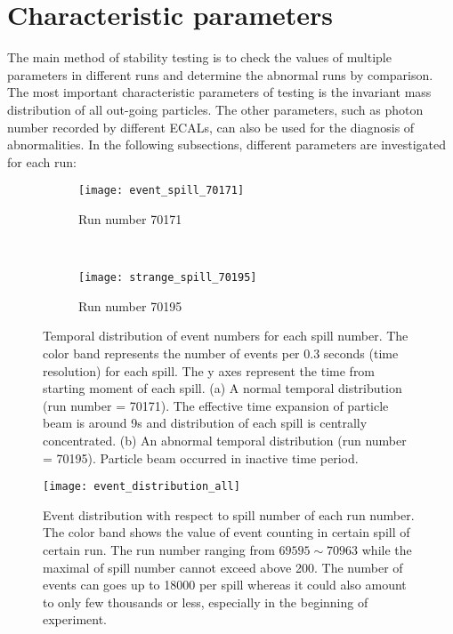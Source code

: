 \section{Characteristic parameters}
The main method of stability testing is to check the values of multiple parameters in different runs and determine the abnormal runs by comparison. The most important characteristic parameters of testing is the invariant mass distribution of all out-going particles. The other parameters, such as photon number recorded by different ECALs, can also be used for the diagnosis of abnormalities. In the following subsections, different parameters are investigated for each run:

\begin{figure*}[!ht]
	\centering
	\begin{subfigure}[b]{0.49\textwidth}
		\texttt{[image: event\_spill\_70171]}
		\caption{Run number 70171}
		\label{fig:EveN_spill_normal}
	\end{subfigure}
	~ %
	\begin{subfigure}[b]{0.49\textwidth}
		\texttt{[image: strange\_spill\_70195]}
		\caption{Run number 70195}
		\label{fig:EveN_spill_abnormal}
	\end{subfigure}
	\caption{Temporal distribution of event numbers for each spill number. The color band represents the number of events per 0.3 seconds (time resolution) for each spill. The y axes represent the time from starting moment of each spill. (a) A normal temporal distribution (run number = 70171). The effective time expansion of particle beam is around 9s and distribution of each spill is centrally concentrated. (b) An abnormal temporal distribution (run number = 70195). Particle beam occurred in inactive time period.}
	\label{fig:animals}
\end{figure*}

\begin{figure*}[!h]
	\centering
	\texttt{[image: event\_distribution\_all]}
	\caption{Event distribution with respect to spill number of each run number. The color band shows the value of event counting in certain spill of certain run. The run number ranging from $69595 \sim 70963$ while the maximal of spill number cannot exceed above 200. The number of events can goes up to 18000 per spill whereas it could also amount to only few thousands or less, especially in the beginning of experiment. }
	\label{fig:event_distribution_all}
\end{figure*}

